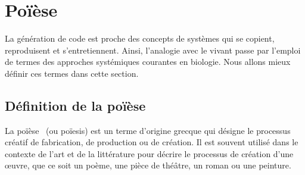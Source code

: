 
\section{Poïèse}

La génération de code est proche des concepts de systèmes qui se copient, reproduisent et s’entretiennent. Ainsi, l’analogie avec le vivant passe par l’emploi de termes des approches systémiques courantes en biologie. Nous allons mieux définir ces termes dans cette section.

\subsection{Définition de la poïèse}

La poïèse~\cite{wiktionary_poiese_2022} (ou poïesis) est un terme d'origine grecque qui désigne le processus créatif de fabrication, de production ou de création. Il est souvent utilisé dans le contexte de l'art et de la littérature pour décrire le processus de création d'une œuvre, que ce soit un poème, une pièce de théâtre, un roman ou une peinture.


